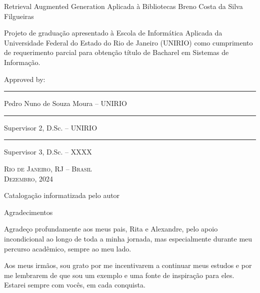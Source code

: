 \documentclass[a4paper, 12pt]{article}
\begin{document}
    \clearpage

    \begin{center}
        Retrieval Augmented Generation Aplicada à Bibliotecas
        \vskip 0.5cm
        Breno Costa da Silva Filgueiras
        \vskip 2.0cm
    \end{center}

    \begin{flushright}
        \parbox{8.0cm}{
        Projeto de graduação apresentado à Escola de Informática Aplicada
        da Universidade Federal do Estado do Rio de Janeiro (UNIRIO) como
        cumprimento de requerimento parcial para obtenção título de Bacharel em
        Sistemas de Informação.}
        \vskip 1.5cm
        Approved by:
        \vskip 1.5cm
        \rule{10.0cm}{.1mm}

        Pedro Nuno de Souza Moura -- UNIRIO
        \vskip 1.0cm
        
        \rule{10.0cm}{.1mm}

        Supervisor 2, D.Sc. -- UNIRIO
        \vskip 1.0cm

        \rule{10.0cm}{.1mm}

        Supervisor 3, D.Sc. -- XXXX
        \vskip 1.0cm
    \end{flushright}
    \begin{center}
        \textsc{Rio de Janeiro, RJ -- Brasil} \\ \textsc{Dezembro, 2024}
    \end{center}
    \clearpage

    \vfill
    
    \begin{center}
        Catalogação informatizada pelo autor
    \end{center}

    \clearpage

    \begin{flushright}
        Agradecimentos
    \end{flushright}
    
    Agradeço profundamente aos meus pais, Rita e Alexandre, pelo apoio incondicional ao longo de toda a minha jornada, mas especialmente durante meu percurso acadêmico, sempre ao meu lado.

    Aos meus irmãos, sou grato por me incentivarem a continuar meus estudos e por me lembrarem de que sou um exemplo e uma fonte de inspiração para eles. Estarei sempre com vocês, em cada conquista.
    
\end{document}
